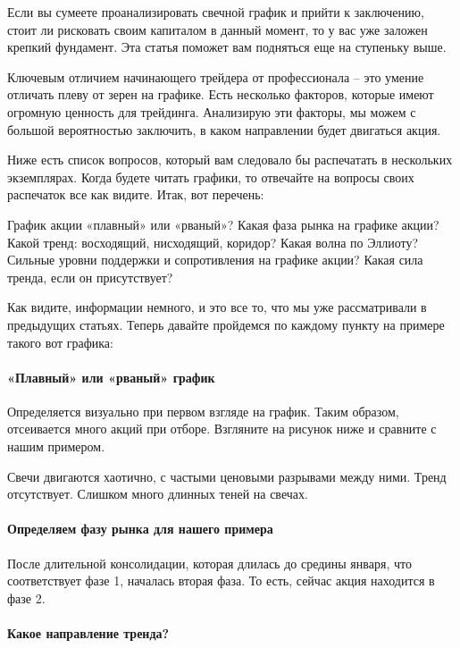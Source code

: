 \documentclass{book}
\begin{document}
Если вы сумеете проанализировать свечной график и прийти к заключению, стоит ли рисковать своим капиталом в данный момент, то у вас уже заложен крепкий фундамент. Эта статья поможет вам подняться еще на ступеньку выше.

Ключевым отличием начинающего трейдера от профессионала – это умение отличать плеву от зерен на графике. Есть несколько факторов, которые имеют огромную ценность для трейдинга. Анализирую эти факторы, мы можем с большой вероятностью заключить, в каком направлении будет двигаться акция.

Ниже есть список вопросов, который вам следовало бы распечатать в нескольких экземплярах. Когда будете читать графики, то отвечайте на вопросы своих распечаток все как видите. Итак, вот перечень:

    График акции «плавный» или «рваный»?
    Какая фаза рынка на графике акции?
    Какой тренд: восходящий, нисходящий, коридор?
    Какая волна по Эллиоту?
    Сильные уровни поддержки и сопротивления на графике акции?
    Какая сила тренда, если он присутствует?

Как видите, информации немного, и это все то, что мы уже рассматривали
в предыдущих статьях. Теперь давайте пройдемся по каждому пункту на
примере такого вот графика:

\paragraph{«Плавный» или «рваный» график}

Определяется визуально при первом взгляде на график. Таким образом, отсеивается много акций при отборе. Взгляните на рисунок ниже и сравните с нашим примером.

Свечи двигаются хаотично, с частыми ценовыми разрывами между
ними. Тренд отсутствует. Слишком много длинных теней на свечах.

\paragraph{Определяем фазу рынка для нашего примера}

После длительной консолидации, которая длилась до средины января, что
соответствует фазе 1, началась вторая фаза. То есть, сейчас акция
находится в фазе 2.

\paragraph{Какое направление тренда?}
\end{document}

